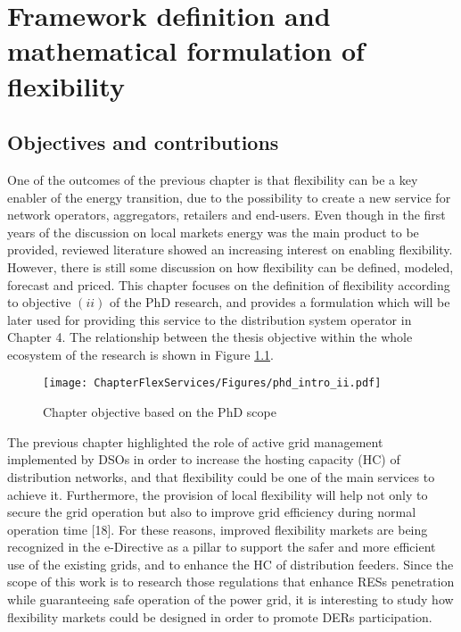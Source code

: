 \chapter{Framework definition and mathematical formulation of flexibility}
\label{chapterFlexibility}

\section{Objectives and contributions}
One of the outcomes of the previous chapter is that flexibility can be a key enabler of the energy transition, due to the possibility to create a new service for network operators, aggregators, retailers and end-users. Even though in the first years of the discussion on local markets energy was the main product to be provided, reviewed literature showed an increasing interest on enabling flexibility. However, there is still some discussion on how flexibility can be defined, modeled, forecast and priced. This chapter focuses on the definition of flexibility according to objective $(ii)$ of the PhD research, and provides a formulation which will be later used for providing this service to the distribution system operator in Chapter 4. The relationship between the thesis objective within the whole ecosystem of the research is shown in Figure \ref{fig:chapter_obj_ii}.


\begin{figure}[htbp]
	\centering
	\texttt{[image: ChapterFlexServices/Figures/phd\_intro\_ii.pdf]}
		\caption{Chapter objective based on the PhD scope}
	\label{fig:chapter_obj_ii}  
\end{figure}

The previous chapter highlighted the role of active grid management implemented by DSOs in order to increase the hosting capacity (HC) of distribution networks, and that flexibility could be one of the main services to achieve it. Furthermore, the provision of local flexibility will help not only to secure the grid operation but also to improve grid efficiency during normal operation time [18]. For these reasons, improved flexibility markets are being recognized in the e-Directive as a pillar to support the safer and more efficient use of the existing grids, and to enhance the HC of distribution feeders. Since the scope of this work is to research those regulations that enhance RESs penetration while guaranteeing safe operation of the power grid, it is interesting to study how flexibility markets could be designed in order to promote DERs participation.


